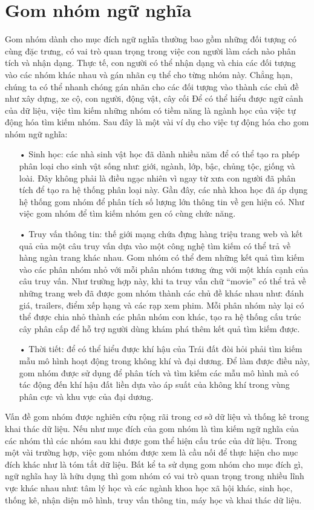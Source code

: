 \section{Gom nhóm ngữ nghĩa}
Gom nhóm dành cho mục đích ngữ nghĩa thường bao gồm những đối tượng có cùng đặc trưng, có vai trò quan trọng trong việc con người làm cách nào phân tích và nhận dạng.
Thực tế, con người có thể nhận dạng và chia các đối tượng vào các nhóm khác nhau và gán nhãn cụ thể cho từng nhóm này.
Chẳng hạn, chúng ta có thể nhanh chóng gán nhãn cho các đối tượng vào thành các chủ đề như xây dựng, xe cộ, con người, động vật, cây cối\lots
Để có thể hiểu được ngữ cảnh của dữ liệu, việc tìm kiếm những nhóm có tiềm năng là ngành học của việc tự động hóa tìm kiếm nhóm.
Sau đây là một vài ví dụ cho việc tự động hóa cho gom nhóm ngữ nghĩa:
\begin{enumerate}
\item[•]Sinh học: các nhà sinh vật học đã dành nhiều năm để có thể tạo ra phép phân loại cho sinh vật sống như: giới, ngành, lớp, bậc, chủng tộc, giống và loài.
Đây không phải là điều ngạc nhiên vì ngay từ xưa con người đã phân tích để tạo ra hệ thống phân loại này.
Gần đây, các nhà khoa học đã áp dụng hệ thống gom nhóm để phân tích số lượng lớn thông tin về gen hiện có.
Như việc gom nhóm để tìm kiếm nhóm gen có cùng chức năng.
\item[•]Truy vấn thông tin: thế giới mạng chứa đựng hàng triệu trang web và kết quả của một câu truy vấn dựa vào một công nghệ tìm kiếm có thể trả về hàng ngàn trang khác nhau.
Gom nhóm có thể đem những kết quả tìm kiếm vào các phân nhóm nhỏ với mỗi phân nhóm tương ứng với một khía cạnh của câu truy vấn.
Như trường hợp này, khi ta truy vấn chữ ``movie'' có thể trả về những trang web  đã được gom nhóm thành các chủ đề khác nhau như: đánh giá, trailers, điểm xếp hạng và các rạp xem phim.
Mỗi phân nhóm này lại có thể được chia nhỏ thành các phân nhóm con khác, tạo ra hệ thống cấu trúc cây phân cấp để hỗ trợ người dùng khám phá thêm kết quả tìm kiếm được.
\item[•]Thời tiết: để có thể hiểu được khí hậu của Trái đất đòi hỏi phải tìm kiếm mẫu mô hình hoạt động trong không khí và đại dương.
Để làm được điều này, gom nhóm được sử dụng để phân tích và tìm kiếm các mẫu mô hình mà có tác động đến khí hậu đất liền dựa vào áp suất của không khí trong vùng phân cực và khu vực của đại dương.
\end{enumerate}

Vấn đề gom nhóm được nghiên cứu rộng rãi trong cơ sở dữ liệu và thống kê trong khai thác dữ liệu.
Nếu như mục đích của gom nhóm là tìm kiếm ngữ nghĩa của các nhóm thì  các nhóm sau khi được gom thể hiện cấu trúc của dữ liệu.
Trong một vài trường hợp, việc gom nhóm được xem là cầu nối để thực hiện cho mục đích khác như là tóm tắt dữ liệu.
Bất kể ta sử dụng gom nhóm cho mục đích gì, ngữ nghĩa hay là hữu dụng thì gom nhóm có vai trò quan trọng trong nhiều lĩnh vực khác nhau như: tâm lý học và các ngành khoa học xã hội khác, sinh học, thống kê, nhận diện mô hình, truy vấn thông tin, máy học và khai thác dữ liệu.

